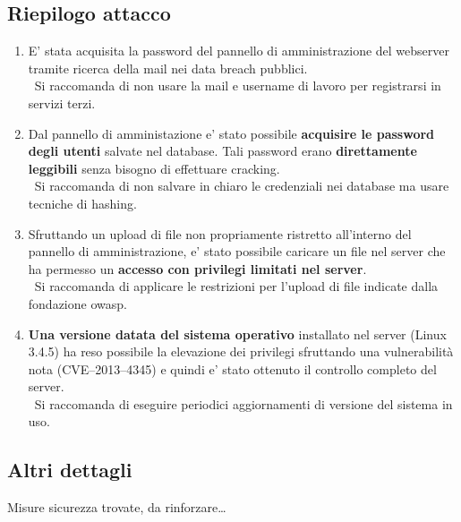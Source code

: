 \begin{cvletter}
\begin{minipage}[t]{0.60\textwidth}
      \sectionsep

      \subsection{Riepilogo attacco}

      \begin{enumerate}
            \color{black}
         \item \normalsize E' stata acquisita la password del pannello di amministrazione del webserver tramite ricerca della mail nei data breach pubblici.\\
            \color{lighttext}\small\faExclamationCircle\ Si raccomanda di non usare la mail e username di lavoro per registrarsi in servizi terzi.

            \vspace{0.3cm}

            \color{black}
         \item \normalsize Dal pannello di amministazione e' stato possibile \textbf{acquisire le password degli utenti} salvate nel database. Tali password erano \textbf{direttamente
            leggibili} senza bisogno di effettuare cracking.\\
            \color{lighttext}\small\faExclamationCircle\ Si raccomanda di non salvare in chiaro le credenziali nei database ma usare tecniche di hashing.

            \vspace{0.3cm}

            \color{black}
         \item \normalsize Sfruttando un upload di file non propriamente ristretto all'interno del pannello di amministrazione, e' stato possibile caricare un file nel server che ha permesso un \textbf{accesso con 
            privilegi limitati nel server}.\\
            \color{lighttext}\small\faExclamationCircle\ Si raccomanda di applicare le restrizioni per l'upload di file indicate dalla fondazione owasp.

            \vspace{0.3cm}

            \color{black}
         \item \normalsize \textbf{Una versione datata del sistema operativo} installato nel server (Linux 3.4.5) ha reso possibile la elevazione dei privilegi sfruttando una vulnerabilità nota (CVE--2013--4345) e quindi 
            e' stato ottenuto il controllo completo del server.\\
            \color{lighttext}\small\faExclamationCircle\ Si raccomanda di eseguire periodici aggiornamenti di versione del sistema in uso.
      \end{enumerate}

   \subsection{Altri dettagli}
   Misure sicurezza trovate, da rinforzare\dots
   \end{minipage}


\end{cvletter}
